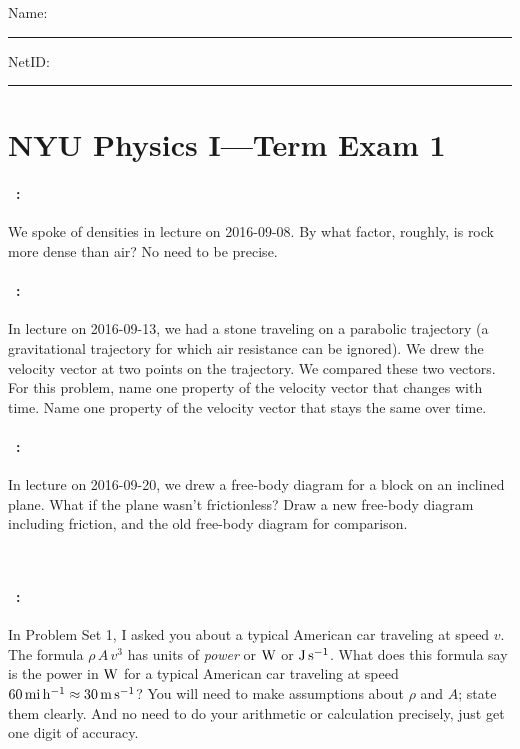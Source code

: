 \documentclass[12pt]{article}
\begin{document}
\noindent
Name: \rule[-1ex]{0.55\textwidth}{0.1pt}
NetID: \rule[-1ex]{0.2\textwidth}{0.1pt}

\section*{NYU Physics I---Term Exam 1}

\paragraph{\problemname~\theproblem:}%
We spoke of densities in lecture on 2016-09-08. By what factor,
roughly, is rock more dense than air? No need to be precise.

\vfill

\paragraph{\problemname~\theproblem:}%
In lecture on 2016-09-13, we had a stone traveling on a parabolic
trajectory (a gravitational trajectory for which air resistance can be
ignored). We drew the velocity vector at two points on the
trajectory. We compared these two vectors. For this problem, name one
property of the velocity vector that changes with time. Name one
property of the velocity vector that stays the same over time.

\vfill

\paragraph{\problemname~\theproblem:}%
In lecture on 2016-09-20, we drew a free-body diagram for a block on
an inclined plane. What if the plane wasn't frictionless? Draw a new
free-body diagram including friction, and the old free-body diagram
for comparison.

\vfill
~

\clearpage
\paragraph{\problemname~\theproblem:}%
In Problem Set 1, I asked you about a typical American car traveling
at speed $v$.  The formula $\rho\,A\,v^3$ has units of \emph{power} or
$\mathrm{W}$ or $\mathrm{J}\,\mathrm{s}^{-1}$.  What does this formula say is the power in
$\mathrm{W}$ for a typical American car traveling at speed $60\,\mathrm{mi}\,\mathrm{h}^{-1}\approx
30\,\mathrm{m}\,\mathrm{s}^{-1}$? You will need to make assumptions about $\rho$ and $A$; state them
clearly. And no need to do your arithmetic or calculation precisely, just
get one digit of accuracy.
\end{document}

